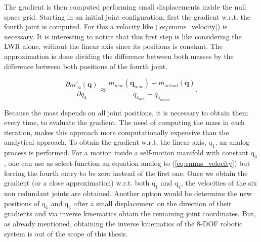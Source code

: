







The gradient is then computed performing small displacements inside the null space grid. Starting in an initial joint configuration, first the gradient w.r.t. the fourth joint is computed. For this a velocity like (\ref{eq:smms_velocity}) is necessary. It is interesting to notice that this first step is like considering the LWR alone, without the linear axis since its positions is constant. The approximation is done dividing the difference between both  masses by the difference between both positions of the fourth joint. 



\begin{equation}
\frac{\partial {m'_u(\mathbf{q})}}{\partial {q_4}} \approx \frac{m_{new}(\mathbf{q}_{new}) - m_{actual}(\mathbf{q})}{ q_{4_{new}} - q_{4_{actual}}}.
\label{eq:approx_grad_q4}
\end{equation}



Because the mass depends on all joint positions, it is necessary to obtain them every time, to evaluate the gradient. The need of computing the mass in each iteration, makes this approach more computationally expensive than the analytical approach. To obtain the gradient w.r.t. the linear axis, $\mathrm{q_1}$, an analog process is performed. For a motion inside a self-motion manifold with constant $\mathrm{q_4}$, one can use as select-function an equation analog to (\ref{eq:smms_velocity}) but forcing the fourth entry to be zero instead of the first one. 
Once we obtain the gradient (or a close approximation) w.r.t. both $\mathrm{q_1}$ and $\mathrm{q_4}$, the velocities of the six non redundant joints are obtained. 
Another option would be determine the new positions of $\mathrm{q_1}$ and $\mathrm{q_4}$ after a small displacement on the direction of their gradients and via inverse kinematics obtain the remaining joint coordinates. But, as already mentioned, obtaining the inverse kinematics of the 8-DOF robotic system is out of the scope of this thesis.



